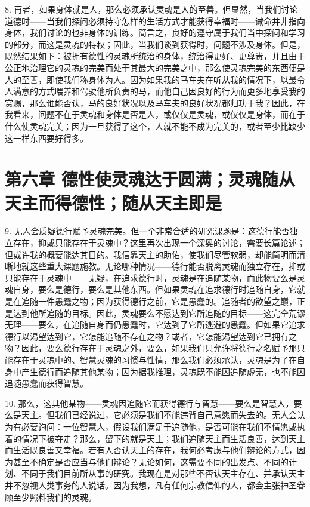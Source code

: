 8. 再者，如果身体就是人，那么必须承认灵魂是人的至善。但显然，当我们讨论道德时——当我们探问必须持守怎样的生活方式才能获得幸福时——诫命并非指向身体，我们讨论的也非身体的训练。简言之，良好的遵守属于我们当中探问和学习的部分，而这是灵魂的特权；因此，当我们谈到获得时，问题不涉及身体。但是，既然结果如下：被拥有德性的灵魂所统治的身体，统治得更好、更尊贵，并且由于公正地治理它的灵魂的完美而处于其最大的完美之中，那么使灵魂完美的东西便是人的至善，即使我们称身体为人。因为如果我的马车夫在听从我的情况下，以最令人满意的方式喂养和驾驶他所负责的马，而他自己因良好的行为而更多地享受我的赏赐，那么谁能否认，马的良好状况以及马车夫的良好状况都归功于我？因此，在我看来，问题不在于灵魂和身体是否是人，或仅仅是灵魂，或仅仅是身体，而在于什么使灵魂完美；因为一旦获得了这个，人就不能不成为完美的，或者至少比缺少这一样东西要好得多。\par


\section{第六章 德性使灵魂达于圆满；灵魂随从天主而得德性；随从天主即是}

9. 无人会质疑德行赋予灵魂完美。但一个非常合适的研究课题是：这德行能否独立存在，抑或只能存在于灵魂中？这里再次出现一个深奥的讨论，需要长篇论述；但或许我的概要能达其目的。我信靠天主的助佑，使我们尽管软弱，却能简明而清晰地就这些重大课题施教。无论哪种情况——德行能否脱离灵魂而独立存在，抑或只能存在于灵魂中——无疑，在追求德行时，灵魂是在追随某物，而此物要么是灵魂自身，要么是德行，要么是其他东西。但如果灵魂在追求德行时追随自身，它就是在追随一件愚蠢之物；因为获得德行之前，它是愚蠢的。追随者的欲望之巅，正是达到他所追随的目标。因此，灵魂要么不愿达到它所追随的目标——这完全荒谬无理——要么，在追随自身而仍愚蠢时，它达到了它所逃避的愚蠢。但如果它追求德行以渴望达到它，它怎能追随不存在之物？或者，它怎能渴望达到它已拥有之物？因此，要么德行存在于灵魂之外，要么，如果我们只允许将德行之名赋予那只能存在于灵魂中的、智慧灵魂的习惯与性情，那么我们必须承认，灵魂是为了在自身中产生德行而追随其他某物；因为据我推理，灵魂既不能因追随虚无，也不能因追随愚蠢而获得智慧。\par

10. 那么，这其他某物——灵魂因追随它而获得德行与智慧——要么是智慧人，要么是天主。但我们已经说过，它必须是我们不能违背自己意愿而失去的。无人会认为有必要询问：一位智慧人，假设我们满足于追随他，是否可能在我们不情愿或执着的情况下被夺走？那么，留下的就是天主；我们追随天主而生活良善，达到天主而生活既良善又幸福。若有人否认天主的存在，我何必考虑与他们辩论的方式，因为甚至不确定是否应当与他们辩论？无论如何，这需要不同的出发点、不同的计划、不同于我们目前所从事的研究。我现在是对那些不否认天主存在、并承认天主并不忽视人类事务的人说话。因为我想，凡有任何宗教信仰的人，都会主张神圣眷顾至少照料我们的灵魂。\par

